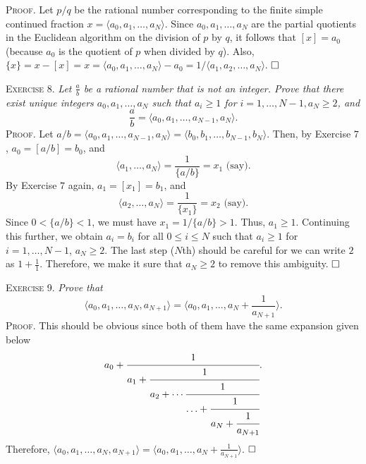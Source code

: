\documentclass[11pt, leqno]{article}
\newcommand{\done}{\ensuremath{\hfill\square}}
\begin{document}
\textsc{Proof}. Let $p/q$ be the rational number corresponding to the finite simple continued fraction $x=\langle a_0, a_1,\ldots,a_N \rangle$. Since $a_0, a_1, \ldots, a_N$ are the partial quotients in the Euclidean algorithm on the division of $p$ by $q$, it follows that $[x] = a_0$ (because $a_0$ is the quotient of $p$ when divided by $q$). Also, $\{x\} = x - [x] = x=\langle a_0, a_1,\ldots,a_N \rangle - a_0 = 1/\langle a_1, a_2,\ldots,a_N \rangle$. \done

\textsc{Exercise 8}. \emph{Let $\frac{a}{b}$ be a rational number that is not an integer. Prove that there exist unique integers $a_0, a_1, \ldots, a_N$ such that $a_i\geq 1$ for $i=1,\ldots, N-1, a_N \geq 2$, and 
\begin{displaymath}
\frac{a}{b} = \langle a_0, a_1, \ldots, a_{N-1}, a_N \rangle.
\end{displaymath}}\textsc{Proof}. Let $a/b = \langle a_0, a_1, \ldots, a_{N-1}, a_N \rangle = \langle b_0, b_1, \ldots, b_{N-1}, b_N \rangle$. Then, by Exercise $7$, $a_0 = [a/b] = b_0$, and 
\begin{displaymath}
\langle a_1, \ldots, a_N \rangle = \frac{1}{\{a/b\}} = x_1 \text{ (say)}.
\end{displaymath}
By Exercise $7$ again, $a_1 = [x_1] = b_1$, and 
\begin{displaymath}
\langle a_2, \ldots, a_N \rangle = \frac{1}{\{x_1\}} = x_2 \text{ (say)}.
\end{displaymath}
Since $0 < \{a/b\} < 1$, we must have $x_1 = 1/\{a/b\} > 1$. Thus, $a_1 \geq 1$.
Continuing this further, we obtain $a_i = b_i$ for all $0 \leq i \leq N$ such that $a_i \geq 1$ for $i = 1, \ldots, N-1$, $a_N \geq 2$. The last step ($N$th) should be careful for we can write $2$ as $1 + \frac{1}{1}$. Therefore, we make it sure that $a_N \geq 2$ to remove this ambiguity. \done

\textsc{Exercise 9}. \emph{Prove that 
\begin{displaymath}
\langle a_0, a_1, \ldots, a_N, a_{N+1} \rangle = \langle a_0, a_1, \ldots, a_N + \frac{1}{a_{N+1}} \rangle.
\end{displaymath}}\textsc{Proof}. This should be obvious since both of them have the same expansion given below
\begin{displaymath}
a_0 + \cfrac{1}{a_1 + \cfrac{1}{a_2 + \cdots \cfrac{1}{\ldots + \cfrac{1}{a_N + \cfrac{1}{a_{N+1}}}}}}.
\end{displaymath}
Therefore, $\langle a_0, a_1, \ldots, a_N, a_{N+1} \rangle = \langle a_0, a_1, \ldots, a_N + \frac{1}{a_{N+1}} \rangle$. \done
\end{document}
